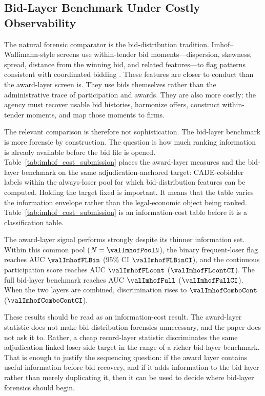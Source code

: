 \subsection{Bid-Layer Benchmark Under Costly Observability}
\label{sec:bid_layer_benchmark}

The natural forensic comparator is the bid-distribution
tradition. Imhof--Wallimann-style screens use within-tender bid
moments---dispersion, skewness, spread, distance from the winning
bid, and related features---to flag patterns consistent with
coordinated bidding
\citep{abrantesmetz2006a,imhof2018screening,imhof2019detecting,huber2019machine,wallimann2023machine}.
These features are closer to conduct than the award-layer screen
is. They use bids themselves rather than the administrative trace
of participation and awards. They are also more costly: the
agency must recover usable bid histories, harmonize offers,
construct within-tender moments, and map those moments to firms.

The relevant comparison is therefore not sophistication. The
bid-layer benchmark is more forensic by construction. The
question is how much ranking information is already available
before the bid file is opened. Table~\ref{tab:imhof_cost_submission}
places the award-layer measures and the bid-layer benchmark on
the same adjudication-anchored target: CADE-cobidder labels
within the always-loser pool for which bid-distribution features
can be computed. Holding the target fixed is important. It means
that the table varies the information envelope rather than the
legal-economic object being ranked.
Table~\ref{tab:imhof_cost_submission} is an information-cost
table before it is a classification table.

The award-layer signal performs strongly despite its thinner
information set. Within this common pool
($N=\valImhofPoolN$), the binary frequent-loser flag reaches AUC
$\valImhofFLBin$ ($95\%$ CI $\valImhofFLBinCI$), and the
continuous participation score reaches AUC $\valImhofFLcont$
($\valImhofFLcontCI$). The full bid-layer benchmark reaches AUC
$\valImhofFull$ ($\valImhofFullCI$). When the two layers are
combined, discrimination rises to $\valImhofComboCont$
($\valImhofComboContCI$).

These results should be read as an information-cost result. The
award-layer statistic does not make bid-distribution forensics
unnecessary, and the paper does not ask it to. Rather, a cheap
record-layer statistic discriminates the same adjudication-linked
loser-side target in the range of a richer bid-layer benchmark.
That is enough to justify the sequencing question: if the award
layer contains useful information before bid recovery, and if it
adds information to the bid layer rather than merely duplicating
it, then it can be used to decide where bid-layer forensics
should begin.


